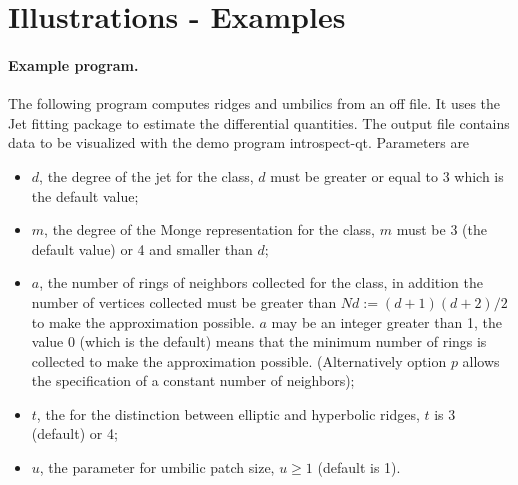 \section{Illustrations - Examples} 
\label{examples}

\paragraph{Example program.}
The following program computes ridges and umbilics from an off
file. It uses the Jet fitting package to estimate the differential
quantities.  The output file contains data to be visualized with the
demo program introspect-qt.  Parameters are
\begin{itemize}
\item
$d$, the degree of the jet for the  class, $d$
must be greater or equal to 3 which is the default value;
\item
$m$, the degree of the Monge representation for the
 class, $m$ must be 3 (the default value) or
4 and smaller than $d$;
\item
$a$, the number of rings of neighbors collected for the
 class, in addition the number of vertices
collected must be greater than $Nd:=(d+1)(d+2)/2$ to make the
approximation possible. $a$ may be an integer greater than 1, the value
0 (which is the default) means that the minimum number of rings is
collected to make the approximation possible. (Alternatively option $p$
allows the specification of a constant number of neighbors);
\item
$t$, the  for the distinction between elliptic and
hyperbolic ridges, $t$ is 3 (default) or 4;
\item
$u$, the parameter for umbilic patch size, $u \geq 1$ (default is 1).
\end{itemize}

